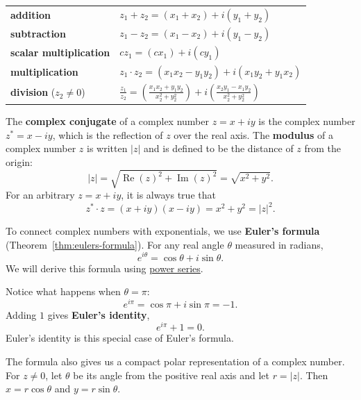 
\begin{center}
\def\arraystretch{1.4}
\begin{tabular}{@{}ll@{}}
\toprule[0.4mm]
\textbf{addition} & $z_1+ z_2=(x_1+ x_2)+i(y_1+ y_2)$\\
\textbf{subtraction} & $z_1- z_2=(x_1- x_2)+i(y_1- y_2)$\\
\textbf{scalar multiplication} & $c z_1=(cx_1)+i(cy_1)$\\
\textbf{multiplication} & $z_1 \cdot z_2=(x_1x_2- y_1y_2)+i(x_1y_2+y_1x_2)$\\
\textbf{division} ($z_2\ne 0$) & $\displaystyle\frac{z_1}{z_2}=\left(\frac{x_1x_2+y_1y_2}{x_2^2+y_2^2}\right)+i\left(\frac{x_2y_1-x_1y_2}{x_2^2+y_2^2}\right)$\\
\bottomrule[0.4mm]
\end{tabular}
\end{center}

The \textbf{complex conjugate} of a complex number $z=x+iy$ is the complex number $z^*=x-iy$, which is the reflection of $z$ over the real axis. The \textbf{modulus} of a complex number $z$ is written $|z|$ and is defined to be the distance of $z$ from the origin:
$$|z|=\sqrt{\operatorname{Re}(z)^2+\operatorname{Im}(z)^2}=\sqrt{x^2+y^2}.$$
For an arbitrary $z=x+iy$, it is always true that
$$z^*\cdot z =(x+iy)(x-iy) = x^2+y^2=|z|^2.$$

To connect complex numbers with exponentials, we use \textbf{Euler's
formula} (Theorem~\ref{thm:eulers-formula}). For any real angle $\theta$
measured in radians,
$$e^{i\theta}=\cos\theta+i\sin\theta.$$
We will derive this formula using
\hyperref[sec:euler-formula-series]{power series}.

Notice what happens when $\theta=\pi$:
$$e^{i\pi}=\cos\pi+i\sin\pi=-1.$$
Adding $1$ gives \textbf{Euler's identity},
$$e^{i\pi}+1=0.$$
Euler's identity is this special case of Euler's formula.

The formula also gives us a compact polar representation of a complex
number. For $z\ne0$, let $\theta$ be its angle from the positive real
axis and let $r=|z|$. Then $x=r\cos\theta$ and $y=r\sin\theta$.


